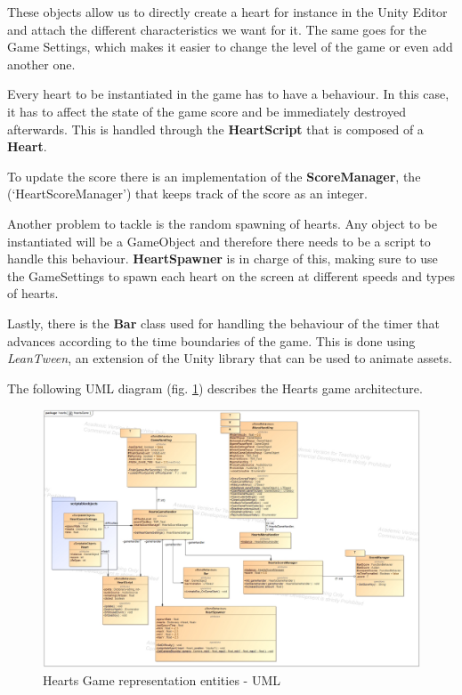 These objects allow us to directly create a heart for instance in the Unity Editor and attach the different characteristics we want for it. The same goes for the Game Settings, which makes it easier to change the level of the game or even add another one.

Every heart to be instantiated in the game has to have a behaviour. In this case, it has to affect the state of the game score and be immediately destroyed afterwards. This is handled through the \textbf{HeartScript} that is composed of a \textbf{Heart}.

To update the score there is an implementation of the \textbf{ScoreManager}, the (`HeartScoreManager') that keeps track of the score as an integer.

Another problem to tackle is the random spawning of hearts. Any object to be instantiated will be a GameObject and therefore there needs to be a script to handle this behaviour. \textbf{HeartSpawner} is in charge of this, making sure to use the GameSettings to spawn each heart on the screen at different speeds and types of hearts.

Lastly, there is the \textbf{Bar} class used for handling the behaviour of the timer that advances according to the time boundaries of the game. This is done using \textit{LeanTween}, an extension of the Unity library that can be used to animate assets.

The following UML diagram (fig. \ref{fig:heartsGameArq}) describes the Hearts game architecture.

\begin{figure}[H]
    \centering
    \includegraphics[width=\linewidth]{Chapters/new_architechture/class__hearts__HeartsGame.jpg}
    \caption{Hearts Game representation entities - UML}
    \label{fig:heartsGameArq}
\end{figure}

